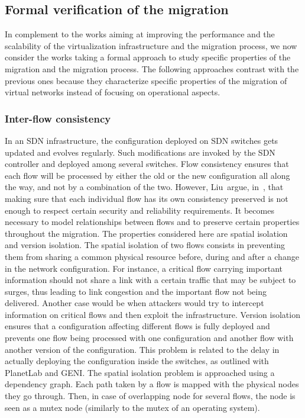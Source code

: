\subsection{Formal verification of the migration}
In complement to the works aiming at improving the performance and the scalability of the virtualization infrastructure and the migration process, we now consider the works taking a formal approach to study specific properties of the migration and the migration process. 
The following approaches contrast with the previous ones because they characterize specific properties of the migration of virtual networks instead of focusing on operational aspects. 

\subsubsection{Inter-flow consistency}
In an SDN infrastructure, the configuration deployed on SDN switches gets updated and evolves regularly. Such modifications are invoked by the SDN controller and deployed among several switches.
Flow consistency ensures that each flow will be processed by either the old or the new configuration all along the way, and not by a combination of the two.
However, Liu~\etal argue, in~\cite{Liu2015a}, that making sure that each individual flow has its own consistency preserved is not enough to respect certain security and reliability requirements.
It becomes necessary to model relationships between flows and to preserve certain properties throughout the migration.
The properties considered here are spatial isolation and version isolation.
The spatial isolation of two flows consists in preventing them from sharing a common physical resource before, during and after a change in the network configuration.
For instance, a critical flow carrying important information should not share a link with a certain traffic that may be subject to surges, thus leading to link congestion and the important flow not being delivered. Another case would be when attackers would try to intercept information on critical flows and then exploit the infrastructure.
Version isolation ensures that a configuration affecting different flows is fully deployed and prevents one flow being processed with one configuration and another flow with another version of the configuration.
This problem is related to the delay in actually deploying the configuration inside the switches, as outlined with PlanetLab and GENI.
The spatial isolation problem is approached using a dependency graph. Each path taken by a flow is mapped with the physical nodes they go through. Then, in case of overlapping node for several flows, the node is seen as a mutex node (similarly to the mutex of an operating system).
